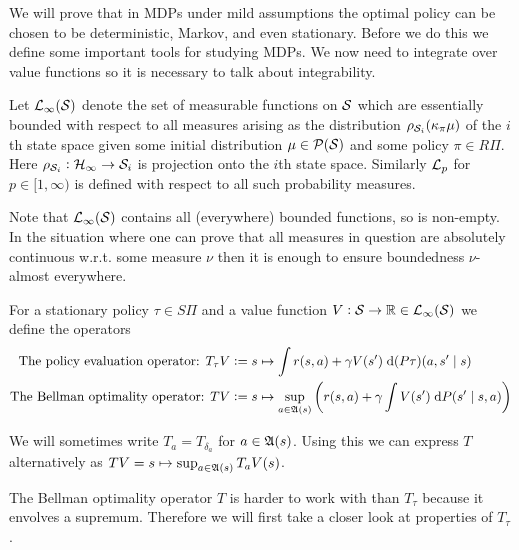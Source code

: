 We will prove that in MDPs under mild assumptions the optimal policy
can be chosen to be deterministic, Markov, and even stationary.
Before we do this we define some important tools for studying MDPs.
We now need to integrate over value functions so it is
necessary to talk about integrability.

\begin{defn}
  Let $\mathcal{L}_\infty(\mathcal{S})$ denote the set of
  measurable functions on $\mathcal{S}$ which are
  essentially bounded with respect to all measures
  arising as the distribution $\rho_{\mathcal{S}_i}(\kappa_\pi \mu)$
  of the $i$th state space given some initial
  distribution $\mu \in \mathcal{P}(\mathcal{S})$ and some policy $\pi \in R\Pi$.
  Here $\rho_{\mathcal{S}_i} : \mathcal{H}_\infty \to \mathcal{S}_i$ is projection
  onto the $i$th state space.
  Similarly $\mathcal{L}_p$ for $p \in [1,\infty)$ is defined with respect to
  all such probability measures.
  \label{defn:essBound}
\end{defn}
\begin{rem}
  Note that $\mathcal{L}_\infty(\mathcal{S})$ contains all (everywhere) bounded
  functions, so is non-empty.
  In the situation where one can prove that all
  measures in question are absolutely continuous w.r.t. some measure
  $\nu$ then it is enough to ensure boundedness $\nu$-almost everywhere.
\end{rem}

\begin{defn}
  For a stationary policy $\tau \in S\Pi$ and a value function
  $V:\mathcal{S} \to \mathbb{R} \in \mathcal{L}_\infty(\mathcal{S})$
  we define the operators 
  \begin{align*}
    \text{The policy evaluation operator: }
    T_\tau V & \vcentcolon= s \mapsto \int r(s, a)
    + \gamma V(s') \; \mathrm{d} (P \tau)(a, s'\mid s)
    \\ \text{The Bellman optimality operator: }
    T V & \vcentcolon= s \mapsto 
    \sup_{a \in \frak{A}(s)} \left(r(s, a) + \gamma \int V(s')
    \; \mathrm{d} P(s' \mid s, a) \right)
  \end{align*}
\end{defn}
\begin{rem}
  We will sometimes write $T_a = T_{\delta_a}$ for $a \in \frak{A}(s)$.
  Using this we can express $T$ alternatively as
  $TV = s \mapsto \sup_{a \in \frak{A}(s)} T_a V(s)$.
\end{rem}

The Bellman optimality operator $T$
is harder to work with than $T_\tau$ because it envolves a supremum.
Therefore we will first take a closer look at properties of $T_\tau$.

